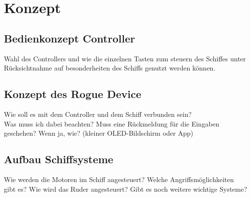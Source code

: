 \chapter{Konzept}

\section{Bedienkonzept Controller}
Wahl des Controllers und wie die einzelnen Tasten zum steuern des Schiffes unter Rücksichtnahme auf 
besonderheiten des Schiffs genutzt werden können.

\section{Konzept des Rogue Device}
Wie soll es mit dem Controller und dem Schiff verbunden sein?
\\
Was muss ich dabei beachten?
Muss eine Rückmeldung für die Eingaben geschehen? Wenn ja, wie?
(kleiner OLED-Bildschirm oder App)

\section{Aufbau Schiffsysteme}
Wie werden die Motoren im Schiff angesteuert?
Welche Angriffsmöglichkeiten gibt es?
Wie wird das Ruder angesteuert?
Gibt es noch weitere wichtige Systeme?